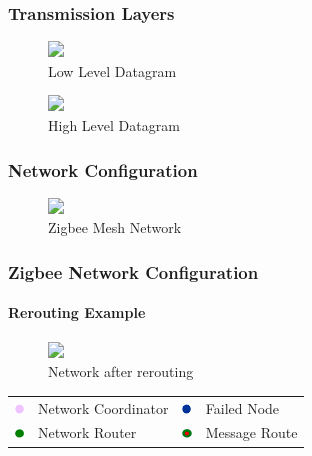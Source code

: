 \documentclass{beamer}
\theoremstyle{definition} \newtheorem{mdefinition}{Definition}
\theoremstyle{plain} \newtheorem{mtheorem}{Theorem}
\theoremstyle{plain} \newtheorem{mcorollary}{Corollary}
\theoremstyle{plain} \newtheorem{mfact}{Fact}
\begin{document}
\begin{frame}
  \frametitle{Transmission Layers}
  \begin{figure}
    \includegraphics<1>[width=0.35\textwidth]{img/packet-low-level.png} 
    \caption{Low Level Datagram}
  \end{figure}              

  \begin{figure}
    \includegraphics<1>[width=0.35\textwidth]{img/packet-upper-level.png}
    \caption{High Level Datagram}
  \end{figure}              

\end{frame}


\begin{frame}
  \frametitle{Network Configuration}
  \begin{figure}
    \includegraphics<1>[width=0.6\textwidth]{img/mesh-routing1.png} 
    \caption{Zigbee Mesh Network}
  \end{figure}
\end{frame}

\begin{frame}
  \frametitle{Zigbee Network Configuration}
  \framesubtitle{Rerouting Example}
  \begin{figure}
    \includegraphics<1>[width=0.6\textwidth]{img/mesh-routing2.png} 
    \caption{Network after rerouting}
  \end{figure}
  \begin{tabular}{llll}
    \includegraphics[height=0.1in]{img/pink.png} & Network Coordinator & \includegraphics[height=0.1in]{img/blue} & Failed Node
 \\
    \includegraphics[height=0.1in]{img/green} & Network Router & \includegraphics[height=0.1in]{img/route} & Message Route 
\\
  \end{tabular}
\end{frame}

  
\end{document}
